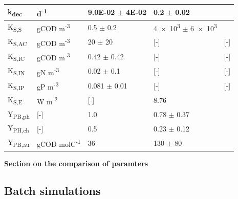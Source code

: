 \begin{table}[tp]
\begin{tabular}{@{}p{2cm} p{3cm} p{4cm} p{4cm} p{3cm} @{}}
        k\textsubscript{dec} & d\textsuperscript{-1} & \num{9.0E-02} $\pm$ \num{4E-02}& \num{0.2} $\pm$ 0.02&  \cite{huangju-sheng1999, huang2001}\\
        \hline
        K\textsubscript{S,S} & gCOD m\textsuperscript{-3} & \num{0.5} $\pm$ \num{0.2} & \num{4e3} $\pm$ \num{6e3}& \cite{gadhamshetty2008,obeid2009}\\
        K\textsubscript{S,AC} & gCOD m\textsuperscript{-3} & \num{20} $\pm$ \num{20} & [-] &[-] \\
        K\textsubscript{S,IC} & gCOD m\textsuperscript{-3} & \num{.42} $\pm$  \num{.42} & [-] &[-] \\
        K\textsubscript{S,IN} & gN m\textsuperscript{-3} &\num{0.02} $\pm$ \num{0.1} & [-]&[-] \\
        K\textsubscript{S,IP} & gP m\textsuperscript{-3} &\num{0.081} $\pm$ \num{0.01} &[-] &[-] \\
        K\textsubscript{S,E} & W m\textsuperscript{-2} & [-] & \num{8.76} & \cite{eltsova2016} \\
        \hline
        Y\textsubscript{PB,ph} &[-] & 1.0 & \num{0.78} $\pm$ \num{0.37}& \cite{gadhamshetty2008, klamt2002, klein1991, mckinlay2011, obeid2009, schultz1982} \\
        Y\textsubscript{PH,ch} &[-] & \num{0.5} &\num{0.23} $\pm$ \num{0.12} &  \cite{madigan1978, schultz1982}\\
        Y\textsubscript{PB,au} &gCOD molC\textsuperscript{-1} &36 & 130 $\pm$ 80 & \cite{wang1993} \\
        \bottomrule
    \end{tabular}
    \label{tab:bioparams}
\end{table}

\textbf{Section on the comparison of paramters}

\subsection{Batch simulations}

